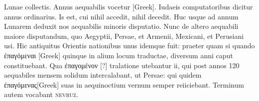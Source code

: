 Lunae collectis.
Annus aequabilis vocetur \textgreek{[Greek]}.
Iudaeis computatoribus
dicitur annus ordinarius.
Is est, cui nihil accedit, nihil decedit.
Huc usque ad annum Lunarem deduxit nos aequabilis minoris
disputatio.
Nunc de altero aequabili maiore disputandum, quo Aegyptii,
Persae, et Armenii, Mexicani, et Perusiani usi.
Hic antiquitus
Orientis nationibus unus idemque fuit: praeter quam si quando
 \textgreek{ἐπαγόμεναι [Greek]}
quinque in alium locum traductae, diversum anni caput constituebant.
Qua \textgreek{ἐπαγομένον [?]} tralatione utebantur ii,
 qui post annos 120
aequabiles mensem solidum intercalabant, ut Persae: qui quidem
 \textgreek{ἐπαγόμενας[Greek]}
suas in aequinoctium vernum semper reiiciebant.
Terminum autem vocabant \textsc{nevruz}.

